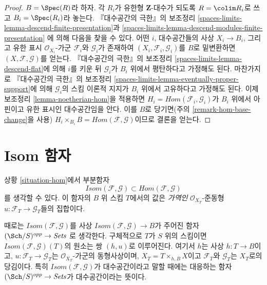 \begin{proof}
\medskip\noindent
$B = \Spec(R)$라 하자. 각 $R_i$가 유한형 $\mathbf{Z}$-대수가 되도록
$R = \colim R_i$로 쓰고 $B_i = \Spec(R_i)$라 놓는다.
『대수공간의 극한』의 보조정리
\ref{spaces-limits-lemma-descend-finite-presentation}과
\ref{spaces-limits-lemma-descend-modules-finite-presentation}
에 의해 다음을 찾을 수 있다. 어떤 $i$, 대수공간들의 사상
$X_i \to B_i$, 그리고 유한 표시 $\mathcal{O}_{X_i}$-가군
$\mathcal{F}_i$와 $\mathcal{G}_i$가 존재하여
$(X_i, \mathcal{F}_i, \mathcal{G}_i)$를 $B$로 밑변환하면
$(X, \mathcal{F}, \mathcal{G})$를 얻는다.
『대수공간의 극한』의 보조정리
\ref{spaces-limits-lemma-descend-flat}에 의해 $i$를 키운 뒤
$\mathcal{G}_i$가 $B_i$ 위에서 평탄하다고 가정해도 된다.
마찬가지로 『대수공간의 극한』의 보조정리
\ref{spaces-limits-lemma-eventually-proper-support}에 의해
$\mathcal{G}_i$의 스킴 이론적 지지가 $B_i$ 위에서 고유하다고
가정해도 된다. 이제 보조정리 \ref{lemma-noetherian-hom}을 적용하면
$H_i = \mathit{Hom}(\mathcal{F}_i, \mathcal{G}_i)$가
$B_i$ 위에서 아핀이고 유한 표시인 대수공간임을 안다.
이를 $B$로 당기면(주의 \ref{remark-hom-base-change}을 사용)
$H_i \times_{B_i} B = \mathit{Hom}(\mathcal{F}, \mathcal{G})$이므로
결론을 얻는다.
\end{proof}






\section{Isom 함자}
\label{section-isom}

\noindent
상황 \ref{situation-hom}에서 부분함자
$$
\mathit{Isom}(\mathcal{F}, \mathcal{G}) \subset
\mathit{Hom}(\mathcal{F}, \mathcal{G})
$$
를 생각할 수 있다. 이 함자의 $B$ 위 스킴 $T$에서의 값은
{\it 가역인} $\mathcal{O}_{X_T}$-준동형
$u : \mathcal{F}_T \to \mathcal{G}_T$들의 집합이다.

\medskip\noindent
때로는 $\mathit{Isom}(\mathcal{F}, \mathcal{G})$를 사상
$\mathit{Isom}(\mathcal{F}, \mathcal{G}) \to B$가 주어진 함자
$(\Sch/S)^{opp} \to \textit{Sets}$
로 생각한다. 구체적으로 $T$가 $S$ 위의 스킴이면
$\mathit{Isom}(\mathcal{F}, \mathcal{G})(T)$의 원소는 쌍
$(h, u)$로 이루어진다. 여기서 $h$는 사상 $h : T \to B$이고,
$u : \mathcal{F}_T \to \mathcal{G}_T$는
$\mathcal{O}_{X_T}$-가군의 동형사상이며,
$X_T = T \times_{h, B} X$이고 $\mathcal{F}_T$와
$\mathcal{G}_T$는 $X_T$로의 당김이다. 특히
$\mathit{Isom}(\mathcal{F}, \mathcal{G})$가 대수공간이라고 말할 때에는
대응하는 함자 $(\Sch/S)^{opp} \to \textit{Sets}$가
대수공간이라는 뜻이다.

